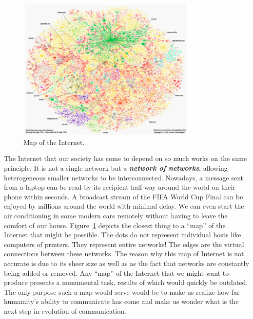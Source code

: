 \begin{figure}[h]
    \centering
    \includegraphics[width=0.8\textwidth]{lesson1/internetmap.eps}
    \caption[Map of the Internet.]{Map of the Internet.}
    \label{fig:1-1_internet}
\end{figure}

The Internet that our society has come to depend on so much works on the same principle.
It is not a single network but a \textit{\textbf{network of networks}}, allowing heterogeneous smaller networks to be interconnected.
Nowadays, a message sent from a laptop can be read by its recipient half-way around the world on their phone within seconds.
A broadcast stream of the FIFA World Cup Final can be enjoyed by millions around the world with minimal delay.
We can even start the air conditioning in some modern cars remotely without having to leave the comfort of our house.
Figure~\ref{fig:1-1_internet} depicts the closest thing to a ``map'' of the Internet that might be possible.
The dots do not represent individual hosts like computers of printers.
They represent entire networks!
The edges are the virtual connections between these networks.
The reason why this map of Internet is not accurate is due to its sheer size as well as as the fact that networks are constantly being added or removed.
Any ``map'' of the Internet that we might want to produce presents a monumental task, results of which would quickly be outdated.
The only purpose such a map would serve would be to make us realize how far humamity's ability to communicate has come and make us wonder what is the next step in evolution of communication.


